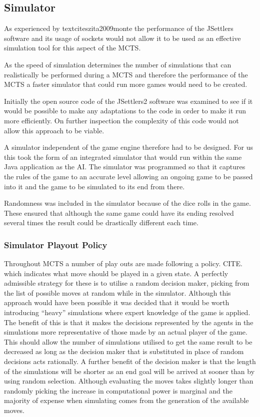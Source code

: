 \documentclass[]{article}
\begin{document}
\subsection{Simulator}
As experienced by textcite{szita2009monte} the performance of the JSettlers software and its usage of sockets would not allow it to be used as an effective simulation tool for this aspect of the MCTS. 

\par As the speed of simulation determines the number of simulations that can realistically be performed during a MCTS and therefore the performance of the MCTS a faster simulator that could run more games would need to be created. 

\par Initially the open source code of the JSettlers2 software was examined to see if it would be possible to make any adaptations to the code in order to make it run more efficiently. On further inspection the complexity of this code would not allow this approach to be viable.

\par A simulator independent of the game engine therefore had to be designed. For us this took the form of an integrated simulator that would run within the same Java application as the AI. The simulator was programmed so that it captures the rules of the game to an accurate level allowing an ongoing game to be passed into it and the game to be simulated to its end from there.

\par Randomness was included in the simulator because of the dice rolls in the game. These ensured that although the same game could have its ending resolved several times the result could be drastically different each time.

\subsubsection{Simulator Playout Policy}
\par Throughout MCTS a number of play outs are made following a policy. CITE. which indicates what move should be played in a given state. A perfectly admissible strategy for these is to utilise a random decision maker, picking from the list of possible moves at random while in the simulator. Although this approach would have been possible it was decided that it would be worth introducing ``heavy'' simulations where expert knowledge of the game is applied. The benefit of this is that it makes the decisions represented by the agents in the simulations more representative of those made by an actual player of the game. This should allow the number of simulations utilised to get the same result to be decreased as long as the decision maker that is substituted in place of random decisions acts rationally. A further benefit of the decision maker is that the length of the simulations will be shorter as an end goal will be arrived at sooner than by using random selection. Although evaluating the moves takes slightly longer than randomly picking the increase in computational power is marginal and the majority of expense when simulating comes from the generation of the available moves.
\end{document}
